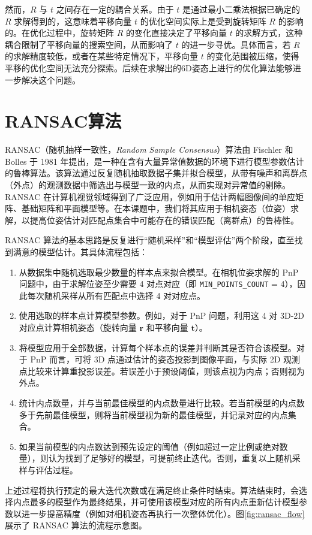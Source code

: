 然而，$R$ 与 $t$ 之间存在一定的耦合关系。由于 $t$ 是通过最小二乘法根据已确定的 $R$ 求解得到的，这意味着平移向量 $t$ 的优化空间实际上是受到旋转矩阵 $R$ 的影响的。在优化过程中，旋转矩阵 $R$ 的变化直接决定了平移向量 $t$ 的求解方式，这种耦合限制了平移向量的搜索空间，从而影响了 $t$ 的进一步寻优。具体而言，若 $R$ 的求解精度较低，或者在某些特定情况下，平移向量 $t$ 的变化范围被压缩，使得平移的优化空间无法充分探索。后续在求解出的6D姿态上进行的优化算法能够进一步解决这个问题。



\section{RANSAC算法}
RANSAC（随机抽样一致性，\textit{Random Sample Consensus}）算法由 Fischler 和 Bolles 于 1981 年提出，是一种在含有大量异常值数据的环境下进行模型参数估计的鲁棒算法。该算法通过反复随机抽取数据子集并拟合模型，从带有噪声和离群点（外点）的观测数据中筛选出与模型一致的内点，从而实现对异常值的剔除。RANSAC 在计算机视觉领域得到了广泛应用，例如用于估计两幅图像间的单应矩阵、基础矩阵和平面模型等。在本课题中，我们将其应用于相机姿态（位姿）求解，以提高位姿估计对匹配点集合中可能存在的错误匹配（离群点）的鲁棒性。

RANSAC 算法的基本思路是反复进行“随机采样”和“模型评估”两个阶段，直至找到满意的模型估计。其具体流程包括：
\begin{enumerate}
	\item 从数据集中随机选取最少数量的样本点来拟合模型。在相机位姿求解的 PnP 问题中，由于求解位姿至少需要 4 对点对应（即 \texttt{MIN\_POINTS\_COUNT} = 4），因此每次随机采样从所有匹配点中选择 4 对对应点。
	\item 使用选取的样本点计算模型参数。例如，对于 PnP 问题，利用这 4 对 3D-2D 对应点计算相机姿态（旋转向量 $\mathbf{r}$ 和平移向量 $\mathbf{t}$）。
	\item 将模型应用于全部数据，计算每个样本点的误差并判断其是否符合该模型。对于 PnP 而言，可将 3D 点通过估计的姿态投影到图像平面，与实际 2D 观测点比较来计算重投影误差。若误差小于预设阈值，则该点视为内点；否则视为外点。
	\item 统计内点数量，并与当前最佳模型的内点数量进行比较。若当前模型的内点数多于先前最佳模型，则将当前模型视为新的最佳模型，并记录对应的内点集合。
	\item 如果当前模型的内点数达到预先设定的阈值（例如超过一定比例或绝对数量），则认为找到了足够好的模型，可提前终止迭代。否则，重复以上随机采样与评估过程。
\end{enumerate}
上述过程将执行预定的最大迭代次数或在满足终止条件时结束。算法结束时，会选择内点最多的模型作为最终结果，并可使用该模型对应的所有内点重新估计模型参数以进一步提高精度（例如对相机姿态再执行一次整体优化）。图\ref{fig:ransac_flow}展示了 RANSAC 算法的流程示意图。


